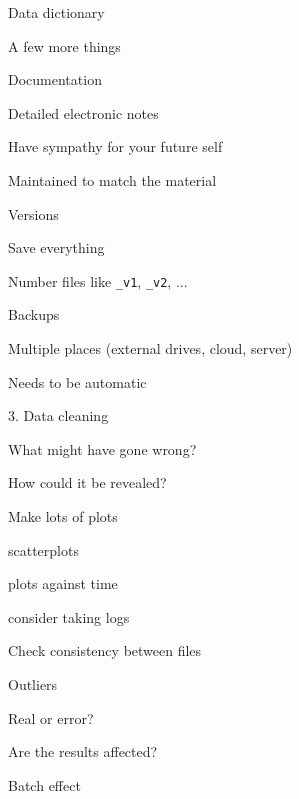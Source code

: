 \documentclass[aspectratio=169,12pt,t]{beamer}
\begin{document}
\begin{frame}[c]{Data dictionary}




\end{frame}




\begin{frame}[c]{A few more things}

  \bbi
\item Documentation
  \bi
\item Detailed electronic notes
\item Have sympathy for your future self
\item Maintained to match the material
  \ei
\item Versions
  \bi
  \item Save everything
  \item Number files like {\tt \_v1}, {\tt \_v2}, ...
  \ei
\item Backups
  \bi
\item Multiple places (external drives, cloud, server)
\item Needs to be automatic
  \ei
  \ei

\end{frame}




\begin{frame}[c]{3. Data cleaning}

  \bbi
\item What might have gone wrong?
\item How could it be revealed?
\item Make lots of plots
  \bi
\item scatterplots
\item plots against time
\item consider taking logs
  \ei
\item Check consistency between files
\item Outliers
  \bi
\item Real or error?
\item Are the results affected?
  \ei
  \ei

\end{frame}


\begin{frame}[c]{Batch effect}




\end{frame}
\end{document}
